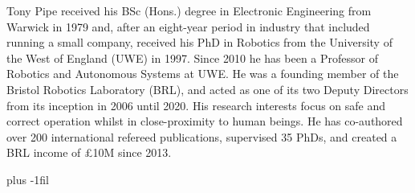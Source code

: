 \documentclass[letterpaper, 10 pt, journal, twoside]{IEEEtran}
\begin{document}
\begin{IEEEbiography}{Tony Pipe} 
received his BSc (Hons.) degree in Electronic Engineering from Warwick in 1979 and, after an eight-year period in industry that included running a small company, received his PhD in Robotics from the University of the West of England (UWE) in 1997. Since 2010 he has been a Professor of Robotics and Autonomous Systems at UWE. He was a founding member of the Bristol Robotics Laboratory (BRL), and acted as one of its two Deputy Directors from its inception in 2006 until 2020. His research interests focus on safe and correct operation whilst in close-proximity to human beings. He has co-authored over 200 international refereed publications, supervised 35 PhDs, and created a BRL income of \pounds10M since 2013. 
\end{IEEEbiography}
\baselineskip plus -1fil  
\end{document}
